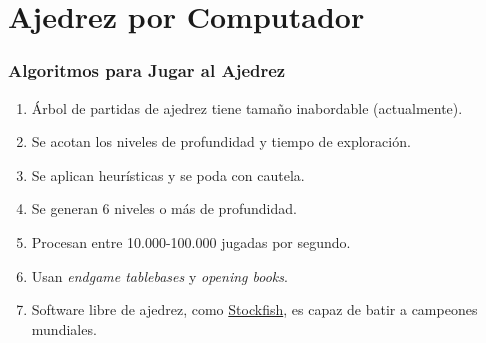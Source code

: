 \documentclass[a4paper,t,xcolor=pst,dvips,colortheme]{beamer}
\begin{document}
\begin{frame}[t]
\end{frame}

\section{Ajedrez por Computador}

\begin{frame}[c]
    \frametitle{Algoritmos para Jugar al Ajedrez}
    \begin{enumerate}[<+->]
        \item Árbol de partidas de ajedrez tiene tamaño inabordable (actualmente). 
        \item Se acotan los niveles de profundidad y tiempo de exploración.
        \item Se aplican heurísticas y se poda con cautela.
        \item Se generan 6 niveles o más de profundidad.
        \item Procesan entre 10.000-100.000 jugadas por segundo.
        \item Usan \emph{endgame tablebases} y \emph{opening books}. 
        \item Software libre de ajedrez, como \href{https://stockfishchess.org/}{Stockfish}, es capaz de batir a campeones mundiales.
    \end{enumerate}
\end{frame}
\end{document}
